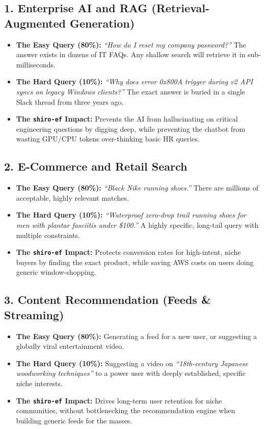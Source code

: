 \documentclass[11pt, a4paper]{article}
\begin{document}
\subsection{1. Enterprise AI and RAG (Retrieval-Augmented Generation)}
\begin{itemize}
    \item \textbf{The Easy Query (80\%):} \textit{``How do I reset my company password?''} The answer exists in dozens of IT FAQs. Any shallow search will retrieve it in sub-milliseconds.
    \item \textbf{The Hard Query (10\%):} \textit{``Why does error 0x800A trigger during v2 API syncs on legacy Windows clients?''} The exact answer is buried in a single Slack thread from three years ago. 
    \item \textbf{The \texttt{shiro-ef} Impact:} Prevents the AI from hallucinating on critical engineering questions by digging deep, while preventing the chatbot from wasting GPU/CPU tokens over-thinking basic HR queries.
\end{itemize}

\subsection{2. E-Commerce and Retail Search}
\begin{itemize}
    \item \textbf{The Easy Query (80\%):} \textit{``Black Nike running shoes.''} There are millions of acceptable, highly relevant matches.
    \item \textbf{The Hard Query (10\%):} \textit{``Waterproof zero-drop trail running shoes for men with plantar fasciitis under \$100.''} A highly specific, long-tail query with multiple constraints.
    \item \textbf{The \texttt{shiro-ef} Impact:} Protects conversion rates for high-intent, niche buyers by finding the exact product, while saving AWS costs on users doing generic window-shopping.
\end{itemize}

\subsection{3. Content Recommendation (Feeds \& Streaming)}
\begin{itemize}
    \item \textbf{The Easy Query (80\%):} Generating a feed for a new user, or suggesting a globally viral entertainment video.
    \item \textbf{The Hard Query (10\%):} Suggesting a video on \textit{``18th-century Japanese woodworking techniques''} to a power user with deeply established, specific niche interests.
    \item \textbf{The \texttt{shiro-ef} Impact:} Drives long-term user retention for niche communities, without bottlenecking the recommendation engine when building generic feeds for the masses.
\end{itemize}
\end{document}
